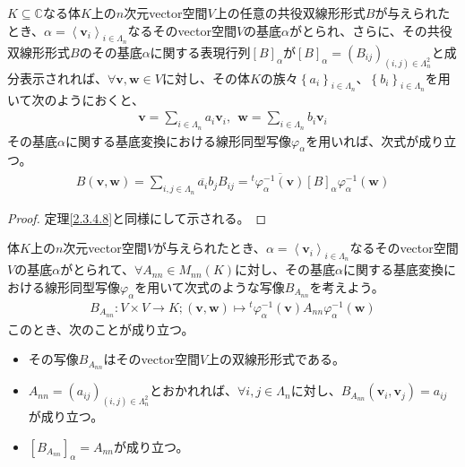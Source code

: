 \documentclass[dvipdfmx]{jsarticle}
\begin{document}
\begin{thm}\label{2.3.4.9}
$K \subseteq \mathbb{C}$なる体$K$上の$n$次元vector空間$V$上の任意の共役双線形形式$B$が与えられたとき、$\alpha = \left\langle \mathbf{v}_{i} \right\rangle_{i \in \varLambda_{n}}$なるそのvector空間$V$の基底$\alpha$がとられ、さらに、その共役双線形形式$B$のその基底$\alpha$に関する表現行列$[ B]_{\alpha}$が$[ B]_{\alpha} = \left( B_{ij} \right)_{(i,j) \in \varLambda_{n}^{2}}$と成分表示されれば、$\forall\mathbf{v},\mathbf{w} \in V$に対し、その体$K$の族々$\left\{ a_{i} \right\}_{i \in \varLambda_{n}}$、$\left\{ b_{i} \right\}_{i \in \varLambda_{n}}$を用いて次のようにおくと、
\begin{align*}
\mathbf{v} = \sum_{i \in \varLambda_{n}} {a_{i}\mathbf{v}_{i}},\ \ \mathbf{w} = \sum_{i \in \varLambda_{n}} {b_{i}\mathbf{v}_{i}}
\end{align*}
その基底$\alpha$に関する基底変換における線形同型写像$\varphi_{\alpha}$を用いれば、次式が成り立つ。
\begin{align*}
B\left( \mathbf{v},\mathbf{w} \right) = \sum_{i,j \in \varLambda_{n}} {\overline{a_{i}}b_{j}B_{ij}} ={}^{t}\overline{\varphi_{\alpha}^{- 1}\left( \mathbf{v} \right)}[ B]_{\alpha}\varphi_{\alpha}^{- 1}\left( \mathbf{w} \right)
\end{align*}
\end{thm}
\begin{proof} 定理\ref{2.3.4.8}と同様にして示される。
\end{proof}
\begin{thm}\label{2.3.4.10}
体$K$上の$n$次元vector空間$V$が与えられたとき、$\alpha = \left\langle \mathbf{v}_{i} \right\rangle_{i \in \varLambda_{n}}$なるそのvector空間$V$の基底$\alpha$がとられて、$\forall A_{nn} \in M_{nn}(K)$に対し、その基底$\alpha$に関する基底変換における線形同型写像$\varphi_{\alpha}$を用いて次式のような写像$B_{A_{nn}}$を考えよう。
\begin{align*}
B_{A_{nn}}:V \times V \rightarrow K;\left( \mathbf{v},\mathbf{w} \right) \mapsto{}^{t}\varphi_{\alpha}^{- 1}\left( \mathbf{v} \right)A_{nn}\varphi_{\alpha}^{- 1}\left( \mathbf{w} \right)
\end{align*}
このとき、次のことが成り立つ。
\begin{itemize}
\item
  その写像$B_{A_{nn}}$はそのvector空間$V$上の双線形形式である。
\item
  $A_{nn} = \left( a_{ij} \right)_{(i,j) \in \varLambda_{n}^{2}}$とおかれれば、$\forall i,j \in \varLambda_{n}$に対し、$B_{A_{nn}}\left( \mathbf{v}_{i},\mathbf{v}_{j} \right) = a_{ij}$が成り立つ。
\item
  $\left[ B_{A_{nn}} \right]_{\alpha} = A_{nn}$が成り立つ。
\end{itemize}
\end{thm}
\end{document}
